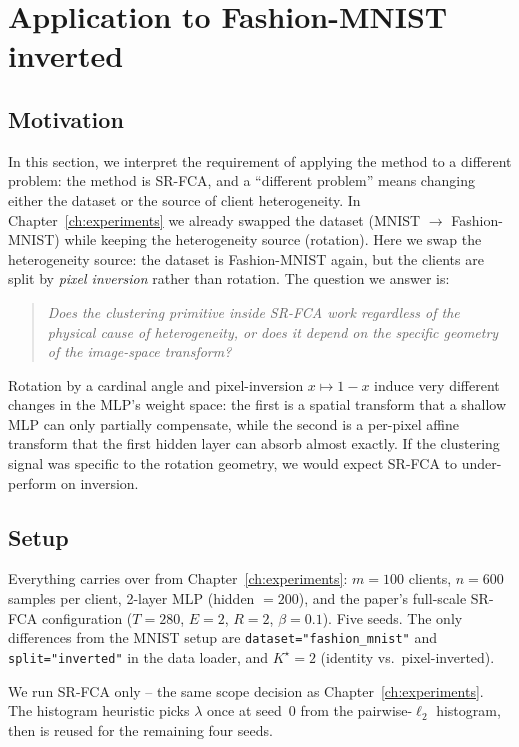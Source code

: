 \chapter{Application to Fashion-MNIST inverted}\label{ch:part-c}

\section{Motivation}\label{sec:part-c-motivation}

In this section, we interpret the requirement of applying the method to a different problem: the method is SR-FCA, and a ``different problem'' means changing either the dataset or the source of client heterogeneity. In Chapter~\ref{ch:experiments} we already swapped the dataset (MNIST $\to$ Fashion-MNIST) while keeping the heterogeneity source (rotation). Here we swap the heterogeneity source: the dataset is Fashion-MNIST again, but the clients are split by \emph{pixel inversion} rather than rotation. The question we answer is:

\begin{quote}
    \itshape Does the clustering primitive inside SR-FCA work regardless of the physical cause of heterogeneity, or does it depend on the specific geometry of the image-space transform?
\end{quote}

Rotation by a cardinal angle and pixel-inversion $x \mapsto 1-x$ induce very different changes in the MLP's weight space: the first is a spatial transform that a shallow MLP can only partially compensate, while the second is a per-pixel affine transform that the first hidden layer can absorb almost exactly. If the clustering signal was specific to the rotation geometry, we would expect SR-FCA to under-perform on inversion.

\section{Setup}\label{sec:part-c-setup}

Everything carries over from Chapter~\ref{ch:experiments}: $m = 100$ clients, $n = 600$ samples per client, 2-layer MLP (hidden $= 200$), and the paper's full-scale SR-FCA configuration ($T = 280$, $E = 2$, $R = 2$, $\beta = 0.1$). Five seeds. The only differences from the MNIST setup are \texttt{dataset="fashion\_mnist"} and \texttt{split="inverted"} in the data loader, and $K^\star = 2$ (identity vs.\ pixel-inverted).

We run SR-FCA only -- the same scope decision as Chapter~\ref{ch:experiments}. The histogram heuristic picks $\lambda$ once at seed~$0$ from the pairwise-$\ell_2$ histogram, then is reused for the remaining four seeds.

